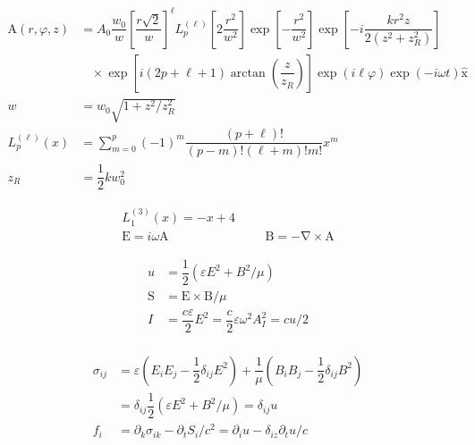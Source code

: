 \documentclass[xcolor=dvipsnames]{beamer}
\newcommand{\f}[2]{\dfrac{#1}{#2}} %
\newcommand{\p}[1]{\left(#1\right)} %
\renewcommand{\sp}[1]{\left[#1\right]} %
\renewcommand{\epsilon}{\varepsilon} %
\renewcommand{\phi}{\varphi} %
\renewcommand{\v}[1]{\boldsymbol{\mathrm{#1}}} %
\newcommand{\uv}[1]{\hat{\boldsymbol{\mathrm{#1}}}} %
\newcommand{\del}{\v\nabla} %
\renewcommand{\d}{\partial} %
\begin{document}
\begin{frame}
  \centering
  \begin{align*}
    \v A\p{r,\phi,z}&=A_0\f{w_0}{w}\sp{\f{r\sqrt 2}{w}}^\ell
    L^{\p{\ell}}_p\sp{2\f{r^2}{w^2}}\exp\sp{-\f{r^2}{w^2}}
    \exp\sp{-i\f{kr^2z}{2\p{z^2+z_R^2}}} \\
    &~~~~\times\exp\sp{i\p{2p+\ell+1}\arctan\p{\f z{z_R}}}
    \exp\p{i\ell\phi}\exp\p{-i\omega t} \uv x\\
    w&=w_0\sqrt{1+z^2/z_R^2}\\
    L^{\p{\ell}}_p\p{x}
    & =\sum_{m=0}^p\p{-1}^m\f{\p{p+\ell}!}{\p{p-m}!\p{\ell+m}!m!}x^m\\
    z_R&=\f12 kw_0^2
  \end{align*}
\end{frame}

\begin{frame}
  \begin{align*}
    L^{\p{3}}_1\p{x}=-x+4\\
    \v E=i\omega\v A &&& \v B=-\del \times\v A
  \end{align*}
\end{frame}

\begin{frame}
  \begin{align*}
    u&=\f12\p{\epsilon E^2+B^2/\mu} \\
    \v S&=\v E\times\v B/\mu \\
    I&=\f{c\epsilon}2E^2=\f c2\epsilon\omega^2A_I^2=cu/2\\
  \end{align*}
\end{frame}

\begin{frame}
  \begin{align*}
    \sigma_{ij}&=\epsilon\p{E_iE_j-\f12\delta_{ij}E^2}
    +\f1\mu\p{B_iB_j-\f12\delta_{ij}B^2} \\
    &=\delta_{ij}\f12\p{\epsilon
      E^2+B^2/\mu}=\delta_{ij}u\\
    f_i&=\d_k\sigma_{ik}-\d_tS_i/c^2=\d_iu-\delta_{iz}\d_tu/c
  \end{align*}
\end{frame}
\end{document}
